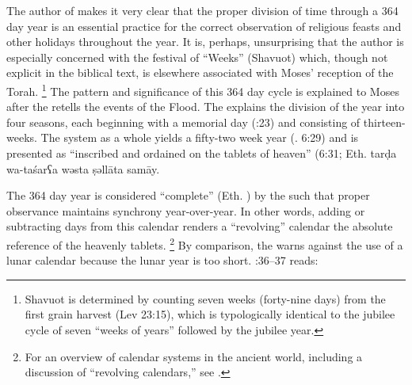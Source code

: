 The author of \jub makes it very clear that the proper division of time through a 364 day year is an essential practice for the correct observation of religious feasts and other holidays throughout the year. It is, perhaps, unsurprising that the author is especially concerned with the festival of ``Weeks'' (Shavuot) which, though not explicit in the biblical text, is elsewhere associated with Moses' reception of the Torah.%
    \footnote{Shavuot is determined by counting seven weeks (forty-nine days) from the first grain harvest (Lev 23:15), which is typologically identical to the jubilee cycle of seven ``weeks of years'' followed by the jubilee year.}
The pattern and significance of this 364 day cycle is explained to Moses after the \ap retells the events of the Flood. The \ap explains the division of the year into four seasons, each beginning with a memorial day (:23) and consisting of thirteen-weeks. The system as a whole yields a fifty-two week year (\jub. 6:29) and is presented as ``inscribed and ordained on the tablets of heaven'' (6:31; Eth.
        {tarḍa wa-taśarʕa wəsta ṣəllāta samāy}.

The 364 day year is considered ``complete'' (Eth. ) by the \ap such that proper observance maintains synchrony year-over-year. In other words, adding or subtracting days from this calendar renders a ``revolving'' calendar \visavis the absolute reference of the heavenly tablets.%
    \footnote{For an overview of calendar systems in the ancient world, including a discussion of ``revolving calendars,'' see \cite[214]{glessmer_flint-vanderkam1999}.}
By comparison, the \ap warns against the use of a lunar calendar because the lunar year is too short. :36--37 reads:

